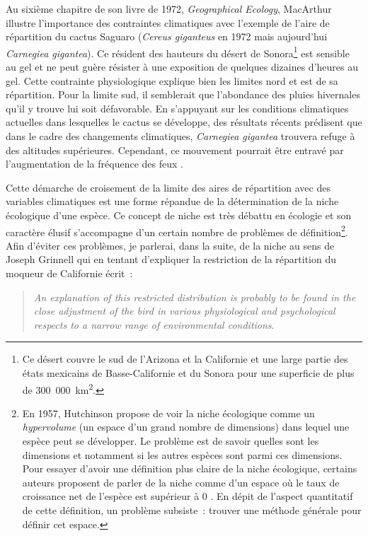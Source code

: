 Au sixième chapitre de son livre de 1972, \emph{Geographical Ecology},
MacArthur illustre l'importance des contraintes climatiques avec
l'exemple de l'aire de répartition du cactus Saguaro (\emph{Cereus
giganteus} en 1972 mais aujourd'hui \emph{Carnegiea gigantea}). Ce
résident des hauteurs du désert de Sonora\footnote{Ce désert couvre le
  sud de l'Arizona et la Californie et une large partie des états
  mexicains de Basse-Californie et du Sonora pour une superficie de plus
  de 300~000~km\textsuperscript{2}.} est sensible au gel et ne peut
guère résister à une exposition de quelques dizaines d'heures au gel.
Cette contrainte physiologique explique bien les limites nord et est de
sa répartition. Pour la limite sud, il semblerait que l'abondance des
pluies hivernales qu'il y trouve lui soit défavorable. En s'appuyant sur
les conditions climatiques actuelles dans lesquelles le cactus se
développe, des résultats récents prédisent que dans le cadre des
changements climatiques, \emph{Carnegiea gigantea} trouvera refuge à des
altitudes supérieures. Cependant, ce mouvement pourrait être entravé par
l'augmentation de la fréquence des feux \citep{Springer2015}.

Cette démarche de croisement de la limite des aires de répartition avec
des variables climatiques est une forme répandue de la détermination de
la niche écologique d'une espèce. Ce concept de niche est très débattu
en écologie et son caractère élusif s'accompagne d'un certain nombre de
problèmes de définition\footnote{En 1957, Hutchinson propose de voir la
  niche écologique comme un \emph{hypervolume} (un espace d'un grand
  nombre de dimensions) dans lequel une espèce peut se développer. Le
  problème est de savoir quelles sont les dimensions et notamment si les
  autres espèces sont parmi ces dimensions. Pour essayer d'avoir une
  définition plus claire de la niche écologique, certains auteurs
  proposent de parler de la niche comme d'un espace où le taux de
  croissance net de l'espèce est supérieur à 0 \citep{Chase2003}. En
  dépit de l'aspect quantitatif de cette définition, un problème
  subsiste~: trouver une méthode générale pour définir cet espace.}.
Afin d'éviter ces problèmes, je parlerai, dans la suite, de la niche au
sens de Joseph Grinnell qui en tentant d'expliquer la restriction de la
répartition du moqueur de Californie écrit~:

\begin{quote}
\emph{An explanation of this restricted distribution is probably to be
found in the close adjustment of the bird in various physiological and
psychological respects to a narrow range of environmental conditions}.
\end{quote}

